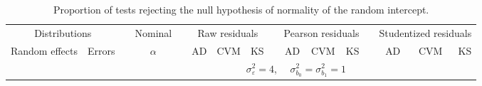 \begin{table}[ht]
\begin{scriptsize}
\begin{tabular}{ll p{.1cm} c p{.1cm} rrr p{.1cm} rrr p{.1cm} rrr}
   \hline
\end{tabular}
\end{scriptsize}
\end{table}

\begin{table}[ht]
\centering
\caption{\label{tab:evalb0} Proportion of tests rejecting the null hypothesis of normality of the random intercept.}
\begin{scriptsize}
\begin{tabular}{ll p{.1cm} c p{.1cm} rrr p{.1cm} rrr p{.1cm} rrr}
  \hline
  \multicolumn{2}{c}{Distributions}& & Nominal & &  \multicolumn{3}{c}{Raw residuals} & & \multicolumn{3}{c}{Pearson residuals} & & \multicolumn{3}{c}{Studentized residuals}\\ \cline{1-2} \cline{6-8} \cline{10-12} \cline{14-16}
  Random effects & Errors & & $\alpha$ & & AD & CVM & KS & & AD & CVM & KS & & AD & CVM & KS \\ 
   \hline
& && && \multicolumn{9}{c}{$\sigma_{\varepsilon}^2 = 4$, \ \ $\sigma_{b_0}^2 = \sigma_{b_1}^2 = 1$} \\ \cline{6-16}


\end{tabular}
\end{scriptsize}
\end{table}
